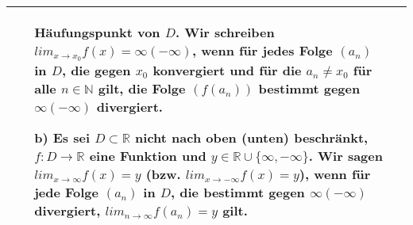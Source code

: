 \begin{table}[H]
\begin{tabularx}{\textwidth}{X m{16cm}}
\begin{itemize}
                                Häufungspunkt von $D$. Wir schreiben $lim_{x \rightarrow x_0}f(x) = \infty (-\infty)$, wenn
                                für jedes Folge $(a_n)$ in $D$, die gegen $x_0$ konvergiert und für die $a_n \neq x_0$ für 
                                alle $n \in \mathbb{N}$ gilt, die Folge $(f(a_n))$ bestimmt gegen $\infty (-\infty)$ divergiert.
                    \item[b)] Es sei $D \subset \mathbb{R}$ \textbf{nicht} nach oben (unten) \textbf{beschränkt}, 
                                $f : D \rightarrow \mathbb{R}$ eine Funktion und $y \in \mathbb{R} \cup \{\infty,-\infty\}$. 
                                Wir sagen $lim_{x \rightarrow \infty} f(x) = y$ (bzw. $lim_{x \rightarrow -\infty} f(x) = y$),
                                wenn für jede Folge $(a_n)$ in $D$, die bestimmt gegen $\infty (-\infty)$ divergiert,
                                $lim_{n \rightarrow \infty} f(a_n) = y$ gilt.
                \end{itemize} \\

        \bottomrule

    \end{tabularx}
    \end{table}

